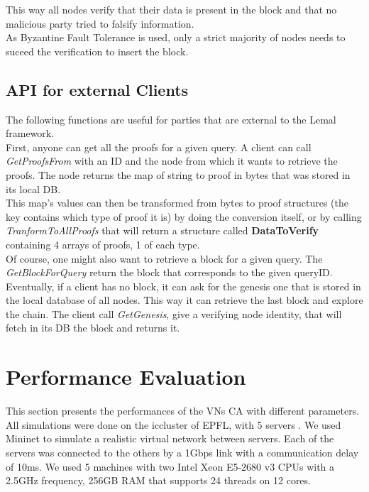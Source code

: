 \documentclass{article}
\begin{document}
This way all nodes verify that their data is present in the block and that no malicious party tried to falsify information.\\
As Byzantine Fault Tolerance is used, only a strict majority of nodes needs to suceed the verification to insert the block.\\

\subsection{API for external Clients}
The following functions are useful for parties that are external to the Lemal framework.\\
First, anyone can get all the proofs for a given query. A client can call \textit{GetProofsFrom} with an ID and the node from which it wants to retrieve the proofs. The node returns the map of string to proof in bytes that was stored in its local DB.\\
This map's values can then be transformed from bytes to proof structures (the key contains which type of proof it is) by doing the conversion itself, or by calling \textit{TranformToAllProofs} that will return a structure called \textbf{DataToVerify} containing 4 arrays of proofs, 1 of each type.\\

Of course, one might also want to retrieve a block for a given query. The \textit{GetBlockForQuery} return the block that corresponds to the given queryID.\\

Eventually, if a client has no block, it can ask for the genesis one that is stored in the local database of all nodes. This way it can retrieve the last block and explore the chain. The client call \textit{GetGenesis}, give a verifying node identity, that will fetch in its DB the block and returns it.

\section{Performance Evaluation}
This section presents the performances of the VNs CA with different parameters. All simulations were done on the iccluster of EPFL, with 5 servers \cite{cluster}. We used Mininet \cite{mininet} to simulate a realistic virtual network between servers. Each of the servers was connected to the others by a 1Gbps link with a communication delay of 10ms. We used 5 machines with two Intel Xeon E5-2680 v3 CPUs with a 2.5GHz frequency, 256GB RAM that supports 24 threads on 12 cores.\\
\end{document}
